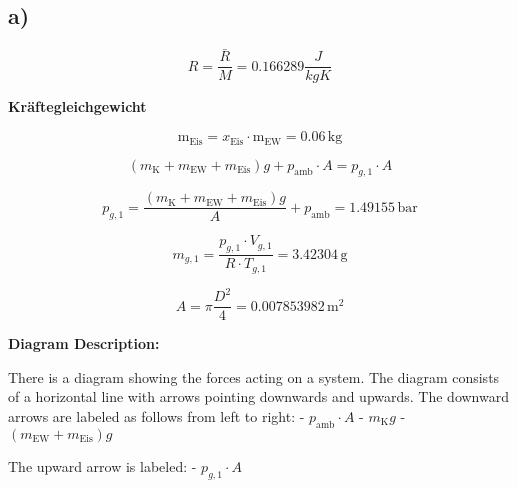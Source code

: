 

\subsection*{a)}

\[
R = \frac{\bar{R}}{M} = 0.166289 \frac{J}{kgK}
\]

\textbf{Kräftegleichgewicht}

\[
\text{m}_{\text{Eis}} = x_{\text{Eis}} \cdot \text{m}_{\text{EW}} = 0.06 \, \text{kg}
\]

\[
(m_{\text{K}} + m_{\text{EW}} + m_{\text{Eis}})g + p_{\text{amb}} \cdot A = p_{g,1} \cdot A
\]

\[
p_{g,1} = \frac{(m_{\text{K}} + m_{\text{EW}} + m_{\text{Eis}})g}{A} + p_{\text{amb}} = 1.49155 \, \text{bar}
\]

\[
m_{g,1} = \frac{p_{g,1} \cdot V_{g,1}}{R \cdot T_{g,1}} = 3.42304 \, \text{g}
\]

\[
A = \pi \frac{D^2}{4} = 0.007853982 \, \text{m}^2
\]

\textbf{Diagram Description:}

There is a diagram showing the forces acting on a system. The diagram consists of a horizontal line with arrows pointing downwards and upwards. The downward arrows are labeled as follows from left to right:
- $p_{\text{amb}} \cdot A$
- $m_{\text{K}}g$
- $(m_{\text{EW}} + m_{\text{Eis}})g$

The upward arrow is labeled:
- $p_{g,1} \cdot A$
